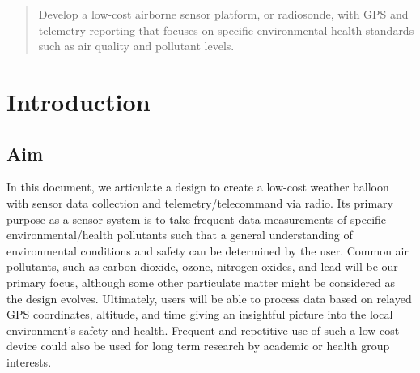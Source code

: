\documentclass[conference,compsoc]{IEEEtran}
\begin{document}




\maketitle

\begin{abstract}
Develop a low-cost airborne sensor platform, or radiosonde, with GPS and telemetry reporting 
that focuses on specific environmental health standards such as air quality and pollutant levels.
\end{abstract}





%
\IEEEpeerreviewmaketitle



\section{Introduction}

\subsection{Aim}
In this document, we articulate a design to create a low-cost weather balloon with sensor data collection
 and telemetry/telecommand via radio. Its primary purpose as a sensor system is to take frequent data 
 measurements of specific environmental/health pollutants such that a general understanding of 
 environmental conditions and safety can be determined by the user. Common air pollutants, such as 
 carbon dioxide, ozone, nitrogen oxides, and lead will be our primary focus, although some other particulate 
 matter might be considered as the design evolves. Ultimately, users will be able to process data based on 
 relayed GPS coordinates, altitude, and time giving an insightful picture into the local environment’s safety 
 and health. Frequent and repetitive use of such a low-cost device could also be used for long term 
 research by academic or health group interests. 
\end{document}
